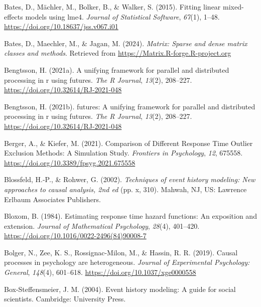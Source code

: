 \documentclass[
  man, donotrepeattitle,floatsintext]{apa6}
\newlength{\cslhangindent}
\newenvironment{CSLReferences}[2] %
 {\begin{list}{}{%
  \setlength{\itemindent}{0pt}
  \setlength{\leftmargin}{0pt}
  \setlength{\parsep}{0pt}
  \ifodd #1
   \setlength{\leftmargin}{\cslhangindent}
   \setlength{\itemindent}{-1\cslhangindent}
  \fi
  \setlength{\itemsep}{#2\baselineskip}}}
 {\end{list}}
\begin{document}
\begin{CSLReferences}{1}{0}
Bates, D., Mächler, M., Bolker, B., \& Walker, S. (2015). Fitting linear mixed-effects models using {lme4}. \emph{Journal of Statistical Software}, \emph{67}(1), 1--48. \url{https://doi.org/10.18637/jss.v067.i01}

Bates, D., Maechler, M., \& Jagan, M. (2024). \emph{Matrix: Sparse and dense matrix classes and methods}. Retrieved from \url{https://Matrix.R-forge.R-project.org}

Bengtsson, H. (2021a). A unifying framework for parallel and distributed processing in r using futures. \emph{The R Journal}, \emph{13}(2), 208--227. \url{https://doi.org/10.32614/RJ-2021-048}

Bengtsson, H. (2021b). {futures}: A unifying framework for parallel and distributed processing in r using futures. \emph{The R Journal}, \emph{13}(2), 208--227. \url{https://doi.org/10.32614/RJ-2021-048}

Berger, A., \& Kiefer, M. (2021). Comparison of {Different Response Time Outlier Exclusion Methods}: {A Simulation Study}. \emph{Frontiers in Psychology}, \emph{12}, 675558. \url{https://doi.org/10.3389/fpsyg.2021.675558}

Blossfeld, H.-P., \& Rohwer, G. (2002). \emph{Techniques of event history modeling: {New} approaches to causal analysis, 2nd ed} (pp. x, 310). Mahwah, NJ, US: Lawrence Erlbaum Associates Publishers.

Bloxom, B. (1984). Estimating response time hazard functions: {An} exposition and extension. \emph{Journal of Mathematical Psychology}, \emph{28}(4), 401--420. \url{https://doi.org/10.1016/0022-2496(84)90008-7}

Bolger, N., Zee, K. S., Rossignac-Milon, M., \& Hassin, R. R. (2019). Causal processes in psychology are heterogeneous. \emph{Journal of Experimental Psychology: General}, \emph{148}(4), 601--618. \url{https://doi.org/10.1037/xge0000558}

Box-Steffensmeier, J. M. (2004). Event history modeling: A guide for social scientists. Cambridge: University Press.


\end{CSLReferences}
\end{document}
